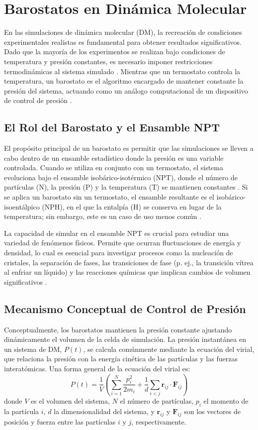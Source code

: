 
\section{Barostatos en Dinámica Molecular}

En las simulaciones de dinámica molecular (DM), la recreación de condiciones experimentales realistas es fundamental para obtener resultados significativos. Dado que la mayoría de los experimentos se realizan bajo condiciones de temperatura y presión constantes, es necesario imponer restricciones termodinámicas al sistema simulado \cite[96]{zhou2022molecular}. Mientras que un termostato controla la temperatura, un barostato es el algoritmo encargado de mantener constante la presión del sistema, actuando como un análogo computacional de un dispositivo de control de presión \cite[113]{zhou2022molecular}.

\subsection{El Rol del Barostato y el Ensamble NPT}
El propósito principal de un barostato es permitir que las simulaciones se lleven a cabo dentro de un ensamble estadístico donde la presión es una variable controlada. Cuando se utiliza en conjunto con un termostato, el sistema evoluciona bajo el ensamble isobárico-isotérmico (NPT), donde el número de partículas (N), la presión (P) y la temperatura (T) se mantienen constantes \cite[113]{zhou2022molecular}. Si se aplica un barostato sin un termostato, el ensamble resultante es el isobárico-isoentálpico (NPH), en el que la entalpía (H) se conserva en lugar de la temperatura; sin embargo, este es un caso de uso menos común \cite[99, 113]{zhou2022molecular}.

La capacidad de simular en el ensamble NPT es crucial para estudiar una variedad de fenómenos físicos. Permite que ocurran fluctuaciones de energía y densidad, lo cual es esencial para investigar procesos como la nucleación de cristales, la separación de fases, las transiciones de fase (p. ej., la transición vítrea al enfriar un líquido) y las reacciones químicas que implican cambios de volumen significativos \cite[113]{zhou2022molecular}.

\subsection{Mecanismo Conceptual de Control de Presión}
Conceptualmente, los barostatos mantienen la presión constante ajustando dinámicamente el volumen de la celda de simulación. La presión instantánea en un sistema de DM, $P(t)$, se calcula comúnmente mediante la ecuación del virial, que relaciona la presión con la energía cinética de las partículas y las fuerzas interatómicas. Una forma general de la ecuación del virial es:
$$
P(t) = \frac{1}{V} \left( \sum_{i=1}^{N} \frac{p_i^2}{2m_i} + \frac{1}{d} \sum_{i<j} \mathbf{r}_{ij} \cdot \mathbf{F}_{ij} \right)
$$
donde $V$ es el volumen del sistema, $N$ el número de partículas, $p_i$ el momento de la partícula $i$, $d$ la dimensionalidad del sistema, y $\mathbf{r}_{ij}$ y $\mathbf{F}_{ij}$ son los vectores de posición y fuerza entre las partículas $i$ y $j$, respectivamente.

